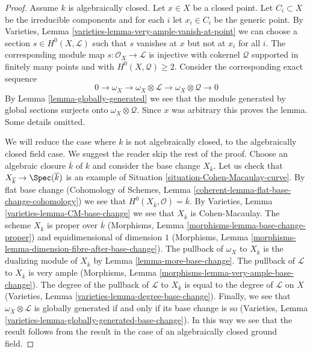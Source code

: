 \begin{proof}
Assume $k$ is algebraically closed. Let $x \in X$ be a closed point.
Let $C_i \subset X$ be the irreducible components and for each $i$
let $x_i \in C_i$ be the generic point. By
Varieties, Lemma \ref{varieties-lemma-very-ample-vanish-at-point}
we can choose a section $s \in H^0(X, \mathcal{L})$ such that $s$
vanishes at $x$ but not at $x_i$ for all $i$. The corresponding
module map $s : \mathcal{O}_X \to \mathcal{L}$ is injective with
cokernel $\mathcal{Q}$ supported in finitely many points and
with $H^0(X, \mathcal{Q}) \geq 2$. Consider the corresponding
exact sequence
$$
0 \to \omega_X \to \omega_X \otimes \mathcal{L} \to
\omega_X \otimes \mathcal{Q} \to 0
$$
By Lemma \ref{lemma-globally-generated} we see that the module generated
by global sections surjects onto $\omega_X \otimes \mathcal{Q}$.
Since $x$ was arbitrary this proves the lemma. Some details omitted.

\medskip\noindent
We will reduce the case where $k$ is not algebraically closed, to
the algebraically closed field case. We suggest the reader skip
the rest of the proof. Choose an algebraic closure $\overline{k}$
of $k$ and consider the base change $X_{\overline{k}}$. Let us
check that $X_{\overline{k}} \to \Spec(\overline{k})$ is an example
of Situation \ref{situation-Cohen-Macaulay-curve}. By flat base change
(Cohomology of Schemes, Lemma \ref{coherent-lemma-flat-base-change-cohomology})
we see that $H^0(X_{\overline{k}}, \mathcal{O}) = \overline{k}$.
By Varieties, Lemma \ref{varieties-lemma-CM-base-change}
we see that $X_{\overline{k}}$ is Cohen-Macaulay. The scheme
$X_{\overline{k}}$ is proper over $\overline{k}$ (Morphisms,
Lemma \ref{morphisms-lemma-base-change-proper}) and
equidimensional of dimension $1$
(Morphisms, Lemma \ref{morphisms-lemma-dimension-fibre-after-base-change}).
The pullback of $\omega_X$ to $X_{\overline{k}}$ is the dualizing
module of $X_{\overline{k}}$ by Lemma \ref{lemma-more-base-change}.
The pullback of $\mathcal{L}$ to $X_{\overline{k}}$ is very ample
(Morphisms, Lemma \ref{morphisms-lemma-very-ample-base-change}).
The degree of the pullback of $\mathcal{L}$ to $X_{\overline{k}}$
is equal to the degree of $\mathcal{L}$ on $X$ (Varieties, Lemma
\ref{varieties-lemma-degree-base-change}). Finally, we see that
$\omega_X \otimes \mathcal{L}$ is globally generated if and only
if its base change is so
(Varieties, Lemma \ref{varieties-lemma-globally-generated-base-change}).
In this way we see that the result follows from the result in the
case of an algebraically closed ground field.
\end{proof}













